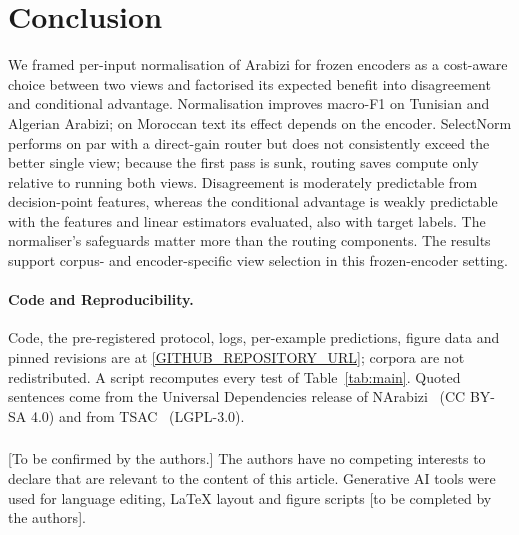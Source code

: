 \section{Conclusion}
\label{sec:conclusion}
We framed per-input normalisation of Arabizi for frozen encoders as a cost-aware choice between two views and factorised its expected benefit into disagreement and conditional advantage. Normalisation improves macro-F1 on Tunisian and Algerian Arabizi; on Moroccan text its effect depends on the encoder. SelectNorm performs on par with a direct-gain router but does not consistently exceed the better single view; because the first pass is sunk, routing saves compute only relative to running both views. Disagreement is moderately predictable from decision-point features, whereas the conditional advantage is weakly predictable with the features and linear estimators evaluated, also with target labels. The normaliser's safeguards matter more than the routing components. The results support corpus- and encoder-specific view selection in this frozen-encoder setting.

\paragraph{Code and Reproducibility.}
Code, the pre-registered protocol, logs, per-example predictions, figure data and pinned revisions are at \url{[GITHUB_REPOSITORY_URL]}; corpora are not redistributed. A script recomputes every test of Table~\ref{tab:main}. Quoted sentences come from the Universal Dependencies release of NArabizi~\cite{seddah2020narabizi} (CC BY-SA 4.0) and from TSAC~\cite{medhaffar2017tsac} (LGPL-3.0).

\begin{credits}
\subsubsection{\discintname}
[To be confirmed by the authors.] The authors have no competing interests to declare that are relevant to the content of this article. Generative AI tools were used for language editing, LaTeX layout and figure scripts [to be completed by the authors].
\end{credits}
